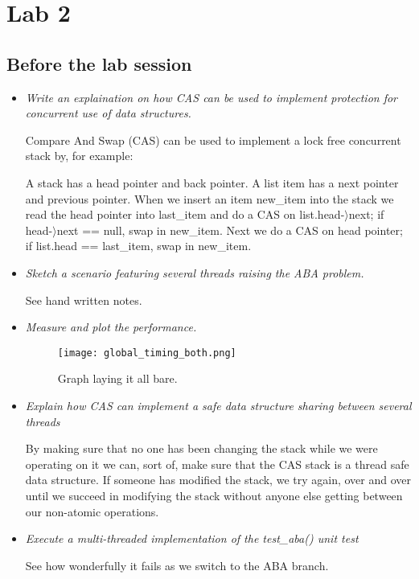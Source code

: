 \documentclass[a4paper,12pt]{article}
\begin{document}
\section{Lab 2}
\subsection{Before the lab session}

\begin{itemize}
\item \textit{Write an explaination on how CAS can be used to implement protection for concurrent use of data structures.}

  Compare And Swap (CAS) can be used to implement a lock free concurrent stack by, for example:

  A stack has a head pointer and back pointer. A list item has a next pointer and previous pointer. When we insert an item new\_item into the stack we read the head pointer into last\_item and do a CAS on list.head-$\rangle$next; if head-$\rangle$next == null, swap in new\_item. Next we do a CAS on head pointer; if list.head == last\_item, swap in new\_item.


\item \textit{Sketch a scenario featuring several threads raising the ABA problem.}

  See hand written notes.


\item \textit{Measure and plot the performance.}

\begin{figure}[h]
  \centering
  \texttt{[image: global\_timing\_both.png]}
  \caption{Graph laying it all bare.}
\end{figure}


\item \textit{Explain how CAS can implement a safe data structure sharing between several threads}

By making sure that no one has been changing the stack while we were operating on it we can, sort of, make sure that the CAS stack is a thread safe data structure. If someone has modified the stack, we try again, over and over until we succeed in modifying the stack without anyone else getting between our non-atomic operations.


\item \textit{Execute a multi-threaded implementation of the test_aba() unit test}

See how wonderfully it fails as we switch to the ABA branch.

\end{itemize}
\end{document}
